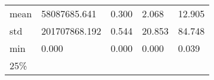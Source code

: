 \documentclass[
  10pt,
  a4paper,
,tablecaptionabove
]{scrartcl}
\begin{document}
\begin{longtable}[]{@{}lllll@{}}
\begin{minipage}[t]{0.11\columnwidth}\raggedright
mean\strut
\end{minipage} & \begin{minipage}[t]{0.20\columnwidth}\raggedright
58087685.641\strut
\end{minipage} & \begin{minipage}[t]{0.13\columnwidth}\raggedright
0.300\strut
\end{minipage} & \begin{minipage}[t]{0.15\columnwidth}\raggedright
2.068\strut
\end{minipage} & \begin{minipage}[t]{0.15\columnwidth}\raggedright
12.905\strut
\end{minipage}\tabularnewline
\begin{minipage}[t]{0.11\columnwidth}\raggedright
std\strut
\end{minipage} & \begin{minipage}[t]{0.20\columnwidth}\raggedright
201707868.192\strut
\end{minipage} & \begin{minipage}[t]{0.13\columnwidth}\raggedright
0.544\strut
\end{minipage} & \begin{minipage}[t]{0.15\columnwidth}\raggedright
20.853\strut
\end{minipage} & \begin{minipage}[t]{0.15\columnwidth}\raggedright
84.748\strut
\end{minipage}\tabularnewline
\begin{minipage}[t]{0.11\columnwidth}\raggedright
min\strut
\end{minipage} & \begin{minipage}[t]{0.20\columnwidth}\raggedright
0.000\strut
\end{minipage} & \begin{minipage}[t]{0.13\columnwidth}\raggedright
0.000\strut
\end{minipage} & \begin{minipage}[t]{0.15\columnwidth}\raggedright
0.000\strut
\end{minipage} & \begin{minipage}[t]{0.15\columnwidth}\raggedright
0.039\strut
\end{minipage}\tabularnewline
\begin{minipage}[t]{0.11\columnwidth}\raggedright
25\%\strut
\end{minipage} & \begin{minipage}[t]{0.20\columnwidth}\raggedright

\end{minipage}
\end{longtable}
\end{document}
